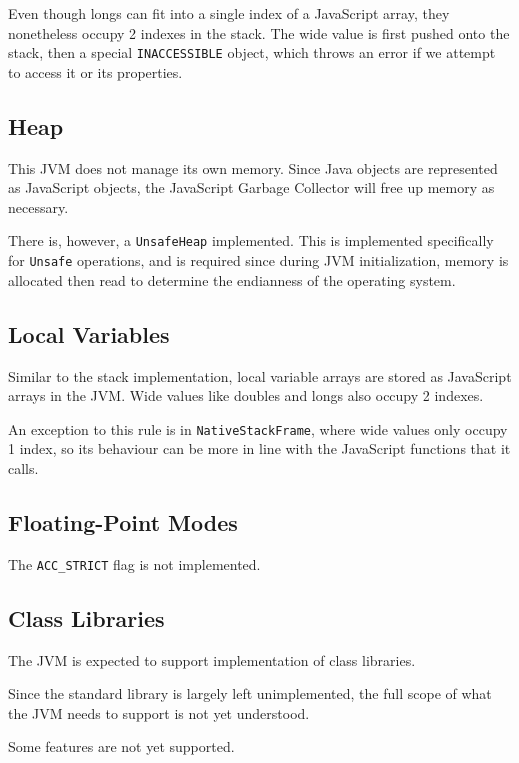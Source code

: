 Even though longs can fit into a single index of a JavaScript array, they nonetheless occupy 2 indexes in the stack.
The wide value is first pushed onto the stack, then a special \texttt{INACCESSIBLE} object, which throws an error if we attempt to access it or its properties.

\subsection{Heap}

This JVM does not manage its own memory. Since Java objects are represented as JavaScript objects, the JavaScript Garbage Collector
will free up memory as necessary.

There is, however, a \texttt{UnsafeHeap} implemented. This is implemented specifically for \texttt{Unsafe} operations, and is required since during JVM initialization,
memory is allocated then read to determine the endianness of the operating system.

\subsection{Local Variables}

Similar to the stack implementation, local variable arrays are stored as JavaScript arrays in the JVM. Wide values like doubles and longs also occupy 2 indexes.

An exception to this rule is in \texttt{NativeStackFrame}, where wide values only occupy 1 index, so its behaviour can be more in line with the JavaScript functions that it calls.

\subsection{Floating-Point Modes}

The \texttt{ACC\_STRICT} flag is not implemented.

\subsection{Class Libraries}

The JVM is expected to support implementation of class libraries.

Since the standard library is largely left unimplemented, the full scope of what the JVM needs to support is not yet understood.

Some features are not yet supported.

